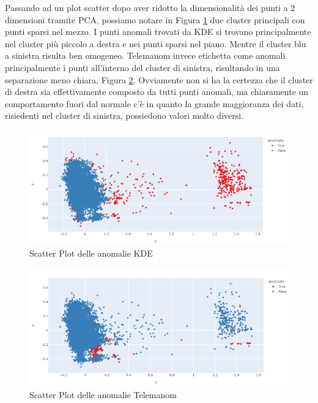 Passando ad un plot scatter dopo aver ridotto la dimensionalità dei punti a 2 dimensioni tramite PCA, possiamo notare in Figura \ref{kde_scatter} due cluster principali con punti sparsi nel mezzo. I punti anomali trovati da KDE si trovano principalmente nel cluster più piccolo a destra e nei punti sparsi nel piano. Mentre il cluster blu a sinistra risulta ben omogeneo.
Telemanom invece etichetta come anomali principalmente i punti all'interno del cluster di sinistra, risultando in una separazione meno chiara, Figura \ref{worst_clf_scatter}.
Ovviamente non si ha la certezza che il cluster di destra sia effettivamente composto da tutti punti anomali, ma chiaramente un comportamento fuori dal normale c'è in quanto la grande maggioranza dei dati, risiedenti nel cluster di sinistra, possiedono valori molto diversi.


\begin{figure}[t]
	\centering
	\includegraphics[width=14cm, scale=1]{images/kde_scatter}
	\caption{Scatter Plot delle anomalie KDE}
	\label{kde_scatter}
		
\end{figure}




\begin{figure}[t]
	\centering
	\includegraphics[width=14cm, scale=1]{images/worst_clf_scatter}
	\caption{Scatter Plot delle anomalie Telemanom}
	\label{worst_clf_scatter}
		
\end{figure}


